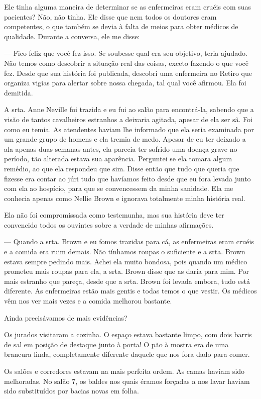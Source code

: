 Ele tinha alguma maneira de determinar se as enfermeiras eram cruéis com
suas pacientes? Não, não tinha. Ele disse que nem todos os doutores eram
competentes, o que também se devia à falta de meios para obter médicos
de qualidade. Durante a conversa, ele me disse:

--- Fico feliz que você fez isso. Se soubesse qual era seu objetivo,
teria ajudado. Não temos como descobrir a situação real das coisas,
exceto fazendo o que você fez. Desde que sua história foi publicada,
descobri uma enfermeira no Retiro que organiza vigias para alertar sobre
nossa chegada, tal qual você afirmou. Ela foi demitida.

A srta. Anne Neville foi trazida e eu fui ao salão para encontrá-la,
sabendo que a visão de tantos cavalheiros estranhos a deixaria agitada,
apesar de ela ser sã. Foi como eu temia. As atendentes haviam lhe
informado que ela seria examinada por um grande grupo de homens e ela
tremia de medo. Apesar de eu ter deixado a ala apenas duas semanas
antes, ela parecia ter sofrido uma doença grave no período, tão alterada
estava sua aparência. Perguntei se ela tomara algum remédio, ao que ela
respondeu que sim. Disse então que tudo que queria que fizesse era
contar ao júri tudo que havíamos feito desde que eu fora levada junto
com ela ao hospício, para que se convencessem da minha sanidade. Ela me
conhecia apenas como Nellie Brown e ignorava totalmente minha história
real.

Ela não foi compromissada como testemunha, mas sua história deve ter
convencido todos os ouvintes sobre a verdade de minhas afirmações.

--- Quando a srta. Brown e eu fomos trazidas para cá, as enfermeiras
eram cruéis e a comida era ruim demais. Não tínhamos roupas o suficiente
e a srta. Brown estava sempre pedindo mais. Achei ela muito bondosa,
pois quando um médico prometeu mais roupas para ela, a srta. Brown disse
que as daria para mim. Por mais estranho que pareça, desde que a srta.
Brown foi levada embora, tudo está diferente. As enfermeiras estão mais
gentis e todas temos o que vestir. Os médicos vêm nos ver mais vezes e a
comida melhorou bastante.

Ainda precisávamos de mais evidências?

Os jurados visitaram a cozinha. O espaço estava bastante limpo, com dois
barris de sal em posição de destaque junto à porta! O pão à mostra era
de uma brancura linda, completamente diferente daquele que nos fora dado
para comer.

Os salões e corredores estavam na mais perfeita ordem. As camas haviam
sido melhoradas. No salão 7, os baldes nos quais éramos forçadas a nos
lavar haviam sido substituídos por bacias novas em folha.

